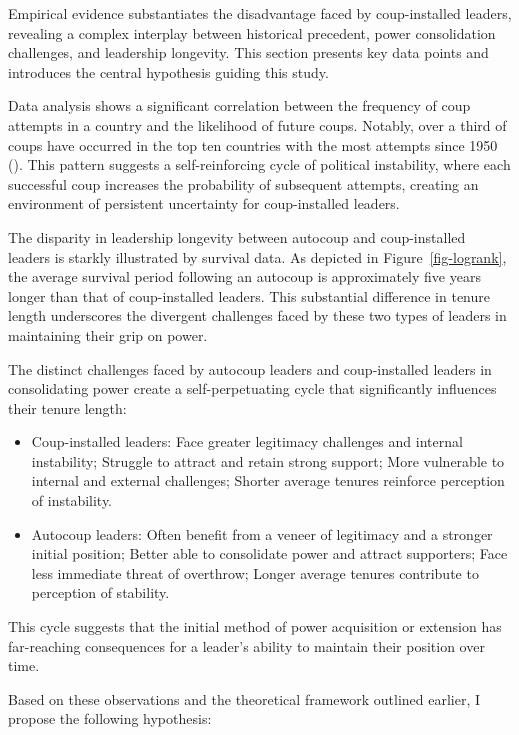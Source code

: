 \documentclass[
  12pt,
]{report}
\begin{document}
Empirical evidence substantiates the disadvantage faced by
coup-installed leaders, revealing a complex interplay between historical
precedent, power consolidation challenges, and leadership longevity.
This section presents key data points and introduces the central
hypothesis guiding this study.

Data analysis shows a significant correlation between the frequency of
coup attempts in a country and the likelihood of future coups. Notably,
over a third of coups have occurred in the top ten countries with the
most attempts since 1950 (). This pattern suggests a self-reinforcing cycle of political
instability, where each successful coup increases the probability of
subsequent attempts, creating an environment of persistent uncertainty
for coup-installed leaders.

The disparity in leadership longevity between autocoup and
coup-installed leaders is starkly illustrated by survival data. As
depicted in Figure~\ref{fig-logrank}, the average survival period
following an autocoup is approximately five years longer than that of
coup-installed leaders. This substantial difference in tenure length
underscores the divergent challenges faced by these two types of leaders
in maintaining their grip on power.

The distinct challenges faced by autocoup leaders and coup-installed
leaders in consolidating power create a self-perpetuating cycle that
significantly influences their tenure length:

\begin{itemize}
\item
  Coup-installed leaders: Face greater legitimacy challenges and
  internal instability; Struggle to attract and retain strong support;
  More vulnerable to internal and external challenges; Shorter average
  tenures reinforce perception of instability.
\item
  Autocoup leaders: Often benefit from a veneer of legitimacy and a
  stronger initial position; Better able to consolidate power and
  attract supporters; Face less immediate threat of overthrow; Longer
  average tenures contribute to perception of stability.
\end{itemize}

This cycle suggests that the initial method of power acquisition or
extension has far-reaching consequences for a leader's ability to
maintain their position over time.

Based on these observations and the theoretical framework outlined
earlier, I propose the following hypothesis:
\end{document}
